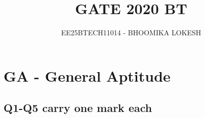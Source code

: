 \documentclass[journal,12pt,onecolumn]{IEEEtran}
\theoremstyle{remark}
\begin{document}
\title{GATE 2020 BT}
\author{EE25BTECH11014 - BHOOMIKA LOKESH}
\maketitle

\renewcommand{\thefigure}{\theenumi}
\renewcommand{\thetable}{\theenumi}

\section*{GA - General Aptitude}
\subsection*{Q1-Q5 carry one mark each}
\end{document}
